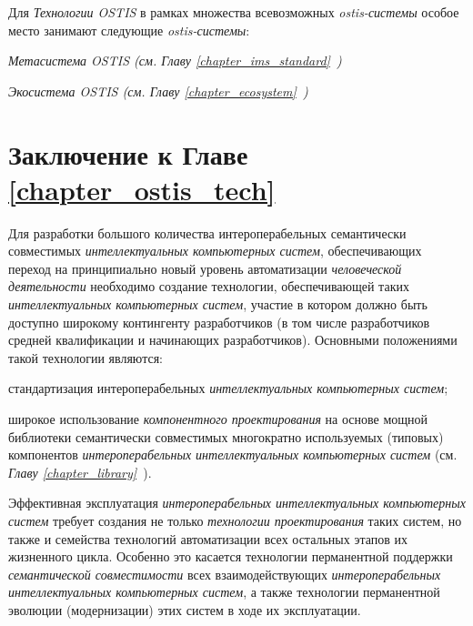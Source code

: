 Для \textit{Технологии OSTIS} в рамках множества всевозможных \textit{ostis-системы} особое место занимают следующие \textit{ostis-системы}:
\begin{textitemize}
	\item \textit{Метасистема OSTIS (см. \textit{Главу \ref{chapter_ims_standard}~})}
	\item \textit{Экосистема OSTIS (см. \textit{Главу \ref{chapter_ecosystem}~})}
\end{textitemize}

\section*{Заключение к Главе \ref{chapter_ostis_tech}}
Для разработки большого количества интероперабельных семантически совместимых \textit{интеллектуальных компьютерных систем}, обеспечивающих переход на принципиально новый уровень автоматизации \textit{человеческой деятельности} необходимо создание технологии, обеспечивающей  таких \textit{интеллектуальных компьютерных систем}, участие в котором должно быть доступно широкому контингенту разработчиков (в том числе разработчиков средней квалификации и начинающих разработчиков). Основными положениями такой технологии являются:
\begin{textitemize}
	\item стандартизация интероперабельных \textit{интеллектуальных компьютерных систем};
	\item широкое использование \textit{компонентного проектирования} на основе мощной библиотеки семантически совместимых многократно используемых (типовых) компонентов \textit{интероперабельных интеллектуальных компьютерных систем} (см. \textit{Главу \ref{chapter_library}~}).
\end{textitemize}

Эффективная эксплуатация \textit{интероперабельных интеллектуальных компьютерных систем} требует создания не только \textit{технологии проектирования} таких систем, но также и семейства технологий автоматизации всех остальных этапов их жизненного цикла. Особенно это касается технологии перманентной поддержки \textit{семантической совместимости} всех взаимодействующих \textit{интероперабельных интеллектуальных компьютерных систем}, а также технологии перманентной эволюции (модернизации) этих систем в ходе их эксплуатации.

%